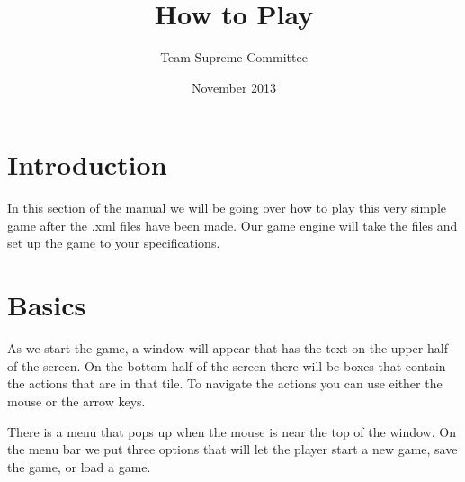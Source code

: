 \documentclass[11pt]{article}
\begin{document}
\title{How to Play}
\author{Team Supreme Committee}
\date{November 2013}
\maketitle


\section{Introduction}

In this section of the manual we will be going over how to play this very simple game after the .xml files have been made. Our game engine will take the files and set up the game to your specifications. 

\section{Basics}

As we start the game, a window will appear that has the text on the upper half of the screen. On the bottom half of the screen there will be boxes that contain the actions that are in that tile. To navigate the actions you can use either the mouse or the arrow keys.

There is a menu that pops up when the mouse is near the top of the window. On the menu bar we put three options that will let the player start a new game, save the game, or load a game.
\end{document}
